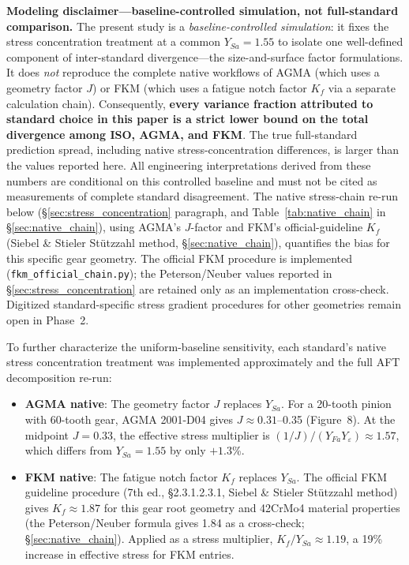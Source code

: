 \documentclass[twocolumn,12pt,a4paper]{article}
\begin{document}
\textbf{Modeling disclaimer---baseline-controlled simulation, not
full-standard comparison.} The present study is a
\emph{baseline-controlled simulation}: it fixes the stress
concentration treatment at a common $Y_{Sa}=1.55$ to isolate one
well-defined component of inter-standard divergence---the size-and-surface
factor formulations. It does \emph{not} reproduce the complete native
workflows of AGMA (which uses a geometry factor $J$) or FKM (which
uses a fatigue notch factor $K_f$ via a separate calculation chain).
Consequently, \textbf{every variance fraction attributed to standard
choice in this paper is a strict lower bound on the total divergence
among ISO, AGMA, and FKM}. The true full-standard prediction spread,
including native stress-concentration differences, is larger than the
values reported here. All engineering interpretations derived from
these numbers are conditional on this controlled baseline and must not
be cited as measurements of complete standard disagreement.
The native stress-chain re-run below (\S\ref{sec:stress_concentration}
paragraph, and Table~\ref{tab:native_chain} in \S\ref{sec:native_chain}),
using AGMA's $J$-factor and FKM's official-guideline $K_f$
(Siebel \& Stieler St\"utzzahl method, \S\ref{sec:native_chain}),
quantifies the bias for this
specific gear geometry. The official FKM procedure is implemented
(\texttt{fkm\_official\_chain.py}); the Peterson/Neuber values
reported in \S\ref{sec:stress_concentration} are retained only as an
implementation cross-check. Digitized standard-specific stress
gradient procedures for other geometries remain open in Phase~2.

To further characterize the uniform-baseline sensitivity, each
standard's native stress concentration treatment was implemented
approximately and the full AFT decomposition re-run:

\begin{itemize}
  \item \textbf{AGMA native}: The geometry factor $J$ replaces
        $Y_{Sa}$. For a 20-tooth pinion with 60-tooth gear, AGMA
        2001-D04 gives $J \approx 0.31$--0.35 (Figure~8). At the
        midpoint $J=0.33$, the effective stress multiplier is
        $(1/J)/(Y_{Fa}Y_\varepsilon) \approx 1.57$, which differs
        from $Y_{Sa}=1.55$ by only $+1.3$\%.
  \item \textbf{FKM native}: The fatigue notch factor $K_f$ replaces
        $Y_{Sa}$. The official FKM guideline procedure (7th ed.,
        \S2.3.1.2.3.1, Siebel \& Stieler St\"utzzahl method) gives
        $K_f \approx 1.87$ for this gear
        root geometry and 42CrMo4 material properties (the
        Peterson/Neuber formula gives 1.84 as a cross-check;
        \S\ref{sec:native_chain}). Applied as a
        stress multiplier, $K_f/Y_{Sa} \approx 1.19$, a 19\% increase
        in effective stress for FKM entries.
\end{itemize}
\end{document}

